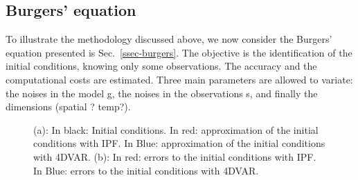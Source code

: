 \documentclass[10pt,openany,onecolumn,a4wide,pof]{article}
\begin{document}
%

\subsection{Burgers' equation}  \label{ssec-results-burgers}
To illustrate the methodology discussed above, we now consider the Burgers' equation presented is Sec.~\ref{ssec-burgers}.
The objective is the identification of the initial conditions, knowing only some observations. 
The accuracy and the computational costs are estimated. 
Three main parameters are allowed to variate: the noises in the model g, the noises in the observations s, and finally the dimensions (spatial ? temp?).

\begin{figure}[h]
\center
{}
\vspace{-1em}
\caption{\small (a): In black: Initial conditions. In red: approximation of the initial conditions with IPF. In Blue: approximation of the initial conditions with 4DVAR. (b): In red: errors to the initial conditions with IPF. In Blue: errors to the initial conditions with 4DVAR.}
\label{fig-err}
\end{figure}
\end{document}
